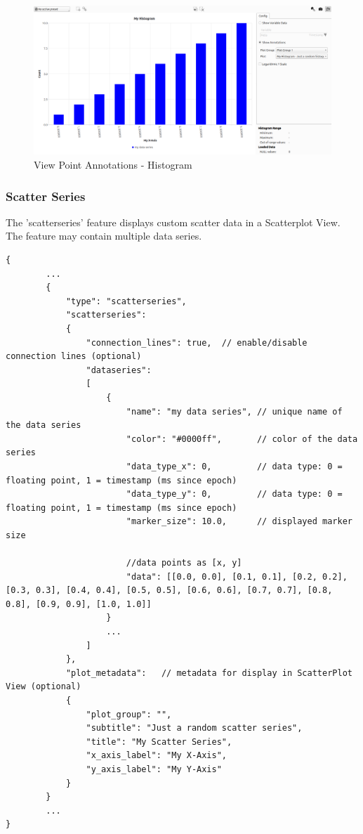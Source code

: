 \begin{figure}[H]
    \center
        \includegraphics[width=15cm]{figures/viewpoints_anno_example_histogram.png}
    \caption{View Point Annotations - Histogram} 
\end{figure}

\subsubsection{Scatter Series} The 'scatterseries' feature displays custom scatter data in a Scatterplot View. 
The feature may contain multiple data series.

\begin{lstlisting}[basicstyle=\small\ttfamily]
{
        ...
        {
            "type": "scatterseries",
            "scatterseries": 
            {
                "connection_lines": true,  // enable/disable connection lines (optional)
                "dataseries": 
                [
                    {
                        "name": "my data series", // unique name of the data series
                        "color": "#0000ff",       // color of the data series
                        "data_type_x": 0,         // data type: 0 = floating point, 1 = timestamp (ms since epoch)
                        "data_type_y": 0,         // data type: 0 = floating point, 1 = timestamp (ms since epoch)
                        "marker_size": 10.0,      // displayed marker size

                        //data points as [x, y]
                        "data": [[0.0, 0.0], [0.1, 0.1], [0.2, 0.2], [0.3, 0.3], [0.4, 0.4], [0.5, 0.5], [0.6, 0.6], [0.7, 0.7], [0.8, 0.8], [0.9, 0.9], [1.0, 1.0]]
                    }
                    ...
                ]
            },
            "plot_metadata":   // metadata for display in ScatterPlot View (optional)
            {
                "plot_group": "",
                "subtitle": "Just a random scatter series",
                "title": "My Scatter Series",
                "x_axis_label": "My X-Axis",
                "y_axis_label": "My Y-Axis"
            }
        }
        ...
}
\end{lstlisting}

